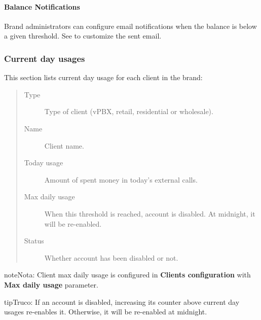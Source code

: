 \documentclass[letterpaper,10pt,spanish]{sphinxmanual}
\begin{document}
\paragraph{Balance Notifications}
\label{administration_portal/brand/billing/prepaid_balances:balance-notifications}
Brand administrators can configure email notifications when the balance is below a given threshold. See
{\hyperref[administration_portal/brand/settings/notification_templates:id1]{}} to customize the sent email.


\subsubsection{Current day usages}
\label{administration_portal/brand/billing/current_day_usages:current-day-usages}\label{administration_portal/brand/billing/current_day_usages::doc}\label{administration_portal/brand/billing/current_day_usages:id1}
This section lists current day usage for each client in the brand:
\begin{quote}
\begin{description}
\item[{Type}] \leavevmode
Type of client (vPBX, retail, residential or wholesale).

\item[{Name}] \leavevmode
Client name.

\item[{Today usage}] \leavevmode
Amount of spent money in today's external calls.

\item[{Max daily usage}] \leavevmode
When this threshold is reached, account is disabled. At midnight, it will be re-enabled.

\item[{Status}] \leavevmode
Whether account has been disabled or not.

\end{description}
\end{quote}

\begin{notice}{note}{Nota:}
Client max daily usage is configured in \textbf{Clients configuration} with \textbf{Max daily usage} parameter.
\end{notice}

\begin{notice}{tip}{Truco:}
If an account is disabled, increasing its counter above current day usages re-enables it. Otherwise, it will be
re-enabled at midnight.
\end{notice}
\end{document}
